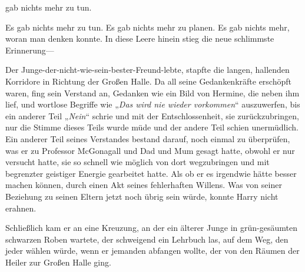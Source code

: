 
 gab nichts mehr zu tun.

\hplettrineextrapara


Es gab nichts mehr zu tun. Es gab nichts mehr zu planen. Es gab nichts mehr, woran man denken konnte. In diese Leere hinein stieg die neue schlimmste Erinnerung—

Der Junge-der-nicht-wie-sein-bester-Freund-lebte, stapfte die langen, hallenden Korridore in Richtung der Großen Halle. Da all seine Gedankenkräfte erschöpft waren, fing sein Verstand an, Gedanken wie ein Bild von Hermine, die neben ihm lief, und wortlose Begriffe wie „\emph{Das wird nie wieder vorkommen}“ auszuwerfen, bis ein anderer Teil „\emph{Nein}“ schrie und mit der Entschlossenheit, sie zurückzubringen, nur die Stimme dieses Teils wurde müde und der andere Teil schien unermüdlich. Ein anderer Teil seines Verstandes bestand darauf, noch einmal zu überprüfen, was er zu Professor McGonagall und Dad und Mum gesagt hatte, obwohl er nur versucht hatte, sie so schnell wie möglich von dort wegzubringen und mit begrenzter geistiger Energie gearbeitet hatte. Als ob er es irgendwie hätte besser machen können, durch einen Akt seines fehlerhaften Willens. Was von seiner Beziehung zu seinen Eltern jetzt noch übrig sein würde, konnte Harry nicht erahnen.

Schließlich kam er an eine Kreuzung, an der ein älterer Junge in grün-gesäumten schwarzen Roben wartete, der schweigend ein Lehrbuch las, auf dem Weg, den jeder wählen würde, wenn er jemanden abfangen wollte, der von den Räumen der Heiler zur Großen Halle ging.

